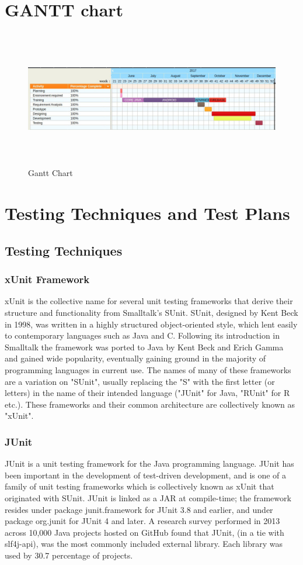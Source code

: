 	\section{GANTT chart}
	
	\begin{figure}[ht]
		\centering
		\includegraphics[height=6cm, width=14cm]{images/gantchart.jpg}
		\caption{Gantt Chart}
	\end{figure}
	
	\section{Testing Techniques and Test Plans}
	\subsection{Testing Techniques}
	
\subsubsection{xUnit Framework}
xUnit is the collective name for several unit testing frameworks that derive their structure and functionality from Smalltalk's SUnit. SUnit, designed by Kent Beck in 1998, was written in a highly structured object-oriented style, which lent easily to contemporary languages such as Java and C. Following its introduction in Smalltalk the framework was ported to Java by Kent Beck and Erich Gamma and gained wide popularity, eventually gaining ground in the majority of programming languages in current use. The names of many of these frameworks are a variation on "SUnit", usually replacing the "S" with the first letter (or letters) in the name of their intended language ("JUnit" for Java, "RUnit" for R etc.). These frameworks and their common architecture are collectively known as "xUnit".
\subsubsection{JUnit}
JUnit is a unit testing framework for the Java programming language. JUnit has been important in the development of test-driven development, and is one of a family of unit testing frameworks which is collectively known as xUnit that originated with SUnit. JUnit is linked as a JAR at compile-time; the framework resides under package junit.framework for JUnit 3.8 and earlier, and under package org.junit for JUnit 4 and later. A research survey performed in 2013 across 10,000 Java projects hosted on GitHub found that JUnit, (in a tie with slf4j-api), was the most commonly included external library. Each library was used by 30.7 percentage of projects.
